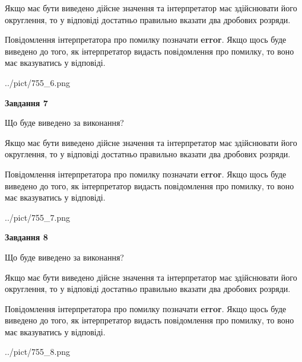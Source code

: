 \documentclass[12pt, ukrainian]{article}
\begin{document}
{\begin {Large}
Якщо має бути виведено дійсне значення та інтерпретатор має здійснювати його округлення, 
то у відповіді достатньо правильно вказати два дробових розряди.

Повідомлення інтерпретатора про помилку позначати \textbf{error}.
Якщо щось буде виведено до того, як інтерпретатор видасть повідомлення про помилку, 
то воно має вказуватись у відповіді. \par

\begin{center}
	{../pict/755_6.png}
\end{center}
\newpage

{\begin {center}\textbf{Завдання 7}\end {center}}\par
Що буде виведено за виконання? \par

Якщо має бути виведено дійсне значення та інтерпретатор має здійснювати його округлення, 
то у відповіді достатньо правильно вказати два дробових розряди.

Повідомлення інтерпретатора про помилку позначати \textbf{error}.
Якщо щось буде виведено до того, як інтерпретатор видасть повідомлення про помилку, 
то воно має вказуватись у відповіді. \par

\begin{center}
	{../pict/755_7.png}
\end{center}
\newpage

{\begin {center}\textbf{Завдання 8}\end {center}}\par
Що буде виведено за виконання? \par

Якщо має бути виведено дійсне значення та інтерпретатор має здійснювати його округлення, 
то у відповіді достатньо правильно вказати два дробових розряди.

Повідомлення інтерпретатора про помилку позначати \textbf{error}.
Якщо щось буде виведено до того, як інтерпретатор видасть повідомлення про помилку, 
то воно має вказуватись у відповіді. \par

\begin{center}
	{../pict/755_8.png}
\end{center}
\newpage


\end{Large}}
\end{document}
